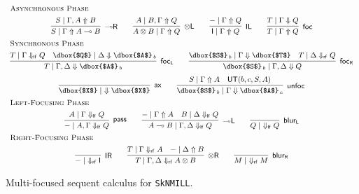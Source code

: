 \documentclass[runningheads]{llncs}
\newcommand{\tl}{\otimes \mathsf{L}}
\newcommand{\tr}{\otimes \mathsf{R}}
\newcommand{\lright}{{\multimap}\mathsf{R}}
\newcommand{\lleft}{{\multimap}\mathsf{L}}
\newcommand{\pass}{\mathsf{pass}}
\newcommand{\unitl}{\mathsf{IL}}
\newcommand{\unitr}{\mathsf{IR}}
\newcommand{\otL}{\tl}
\newcommand{\otR}{\tr}
\newcommand{\lolliR}{\lright}
\newcommand{\lolliL}{\lleft}
\newcommand{\IL}{\unitl}
\newcommand{\IR}{\unitr}
\newcommand{\ax}{\mathsf{ax}}
\newcommand{\ot}{\otimes}
\newcommand{\lolli}{\multimap}
\newcommand{\I}{\mathsf{I}}
\newcommand{\lf}{\dn_\mathsf{lf}}%
\newcommand{\rf}{\dn_\mathsf{rf}}%
\newcommand{\SkNMILL}{\texttt{SkNMILL}}
\newcommand{\UT}{\mathsf{UT}}
\newcommand{\up}{\Uparrow}
\newcommand{\dn}{\Downarrow}
\newcommand{\focL}{\mathsf{foc_L}}
\newcommand{\foc}{\mathsf{foc}}
\newcommand{\focR}{\mathsf{foc_R}}
\newcommand{\blurL}{\mathsf{blur_L}}
\newcommand{\blurR}{\mathsf{blur_R}}
\newcommand{\unfoc}{\mathsf{unfoc}}
\begin{document}
\begin{figure}[t]
  \[
  \small
  \begin{array}{c}
    \multicolumn{1}{l}{\text{\textsc{Asynchronous Phase}}} \\[4pt]
      \infer[\lolliR]{S \mid \Gamma \up A \lolli B}{S \mid \Gamma , A \up B}
    \qquad
    \infer[\otL]{A \ot B \mid \Gamma \up Q}{A \mid  B , \Gamma \up Q}
    \qquad
      \infer[\IL]{\I \mid \Gamma \up Q}{- \mid \Gamma \up Q}    
    \qquad
        \infer[\foc]{T \mid \Gamma \up Q}{
      T \mid \Gamma \dn Q
    }
    \\[4pt]
    \multicolumn{1}{l}{\text{\textsc{Synchronous Phase}}} \\[4pt]
        \infer[\focL]{T \mid \Gamma , \Delta \dn \dbox{$A$}_{\, b}}{
          T \mid \Gamma \lf Q &
          \dbox{$Q$} \mid \Delta \dn \dbox{$A$}_{\, b}
        }
    \qquad
    \infer[\focR]{\dbox{$S$}_{\, b} \mid \Gamma,\Delta \dn Q}{
      \dbox{$S$}_{\, b} \mid \Gamma \dn \dbox{$T$}
      &
      T \mid \Delta \rf Q
    }
    \\[6pt]
        \infer[\ax]{\dbox{$X$} \mid ~ \dn \dbox{$X$}}{}
    \qquad
    \infer[\unfoc]{\dbox{$S$}_{\,b} \mid \Gamma \dn \dbox{$A$}_{\,c}}{
      S \mid \Gamma \up A
      &
      \UT(b,c,S,A)
    }
    \\[4pt]
    \multicolumn{1}{l}{\text{\textsc{Left-Focusing Phase}}} \\[4pt]
    \infer[\pass]{- \mid A , \Gamma \lf Q}{
      A \mid \Gamma \lf Q
    }
    \qquad
    \infer[\lolliL]{A \lolli B \mid \Gamma , \Delta \lf Q}{
      - \mid \Gamma \up A
      &
      B \mid  \Delta \lf Q
    }
    \qquad
        \infer[\blurL]{Q \mid ~ \lf Q}{
      }    
    \\[4pt]
    \multicolumn{1}{l}{\text{\textsc{Right-Focusing Phase}}} \\[4pt]
    \infer[\IR]{- \mid ~ \rf \I}{}
    \qquad
    \infer[\otR]{T \mid \Gamma , \Delta \rf A \ot B}{
      T \mid \Gamma \rf A
      &
      - \mid \Delta \up B
    }
    \qquad
        \infer[\blurR]{M \mid ~ \rf M}{}
    \end{array}
  \]
  \caption{Multi-focused sequent calculus for \SkNMILL.} 
  \label{fig:multi-focus}
\end{figure}
\end{document}

